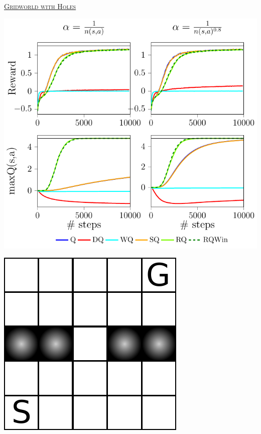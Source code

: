 \documentclass[portrait,a0paper,fontscale=0.312]{baposter}
\newcommand{\listhead}[1] {\textsc{\underline{#1}}}
\begin{document}
\begin{poster}
{\begin{minipage}{0.6\textwidth}
\begin{center}
\begin{minipage}{0.5\textwidth}
    \end{minipage}
  \end{center}
\end{minipage}
\begin{minipage}{0.45\textwidth}
  \begin{center}
    \listhead{Gridworld with Holes}\\
    \vspace{1cm}
    \begin{minipage}{0.5\textwidth}
      \includegraphics[scale=0.50]{./imgs/gridHole/grid_hole.pdf}
    \end{minipage}
    \hspace{0.5cm}
    \begin{minipage}{0.4\textwidth}
      \includegraphics[scale=0.35]{./imgs/gridHole/gridhole.pdf}

\end{minipage}
\end{center}
\end{minipage}}
\end{poster}
\end{document}

